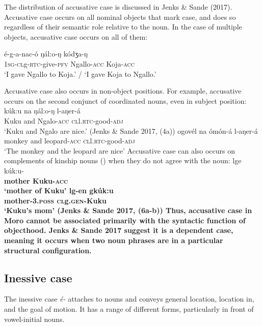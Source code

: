 The distribution of accusative case is discussed in Jenks \& Sande (2017). Accusative case occurs on all nominal objects that mark case, and does so regardless of their semantic role relative to the noun. In the case of multiple objects, accusative case occurs on all of them:

\ea \gll  é-g-a-nac-ó ŋál:o-ŋ kódʒa-ŋ\\
\textsc{1sg-cl}g-\textsc{rtc-}give-\textsc{pfv} Ngallo-\textsc{acc} Koja-\textsc{acc}\\
\glt  `I gave Ngallo to Koja.' / `I gave Koja to Ngallo.'
\z 

Accusative case also occurs in non-object positions. For example, accusative occurs on the second conjunct of coordinated nouns, even in subject position:
\ea
\ea  \gll 	kúk:u na ŋál:o-ŋ l-aŋer-\'a\\
			Kuku {and} Ngalo-\textsc{acc} \textsc{cl}l.\textsc{rtc-}good-\textsc{adj} \\
	\glt 	`Kuku and Ngalo are nice.' \hfill (Jenks \& Sande 2017, (4a))
\ex \gll	ogovél na ómón-á l-aŋer-\'a\\
			monkey and leopard-\textsc{acc} \textsc{cl}l.\textsc{rtc-}good-\textsc{adj}\\
	\glt	`The monkey and the leopard are nice' 
\z 
\z
Accusative case can also occurs on complements of kinship nouns () when they do not agree with the noun:
\ea
\ea   \gll lge k\'uk:u-\bf{}\\
mother Kuku-\textsc{acc}\\
\glt  `mother of Kuku'
\ex \gll  lg-en gk\'uk:u \\
  mother-\textsc{3.poss} \textsc{cl}g.\textsc{gen-}Kuku \\
\glt  `Kuku's mom' \hfill  (Jenks \& Sande 2017, (6a-b))
\z 
\z 
Thus, accusative case in Moro cannot be associated primarily with the syntactic function of objecthood. Jenks \& Sande 2017 suggest it is a dependent case, meaning it occurs when two noun phrases are in a particular structural configuration. 


\subsection{Inessive case}\label{sec:ch6:inessive}

The inessive case \textit{é-} attaches to nouns and conveys general location, location in, and the goal of motion. It has a range of different forms, particularly in front of vowel-initial nouns.

